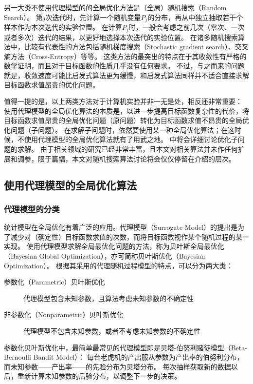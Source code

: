 \documentclass[index]{subfiles}
\begin{document}
另一大类不使用代理模型的的全局优化方法是（全局）随机搜索（Random Search）。
第$j$次迭代时，先计算一个随机变量$P_j$的分布，再从中独立抽取若干个样本作为本次迭代的实验位置。
在计算$P_j$时，一般会考虑之前几次（零次、一次或者多次）迭代的结果，以更好地选择本次迭代的实验位置。
在诸多随机搜索算法中，比较有代表性的方法包括随机梯度搜索（Stochastic gradient search）、交叉熵方法（Cross-Entropy）等等\cite{zabinsky2009}。
这类方法的最突出的特点在于其收敛性有严格的数学证明，而且对于目标函数的性质几乎没有任何要求\cite{zhigljavsky2007}。
不过，与之而来的问题就是，收敛速度可能比启发式算法更为缓慢，和启发式算法同样并不适合直接求解目标函数求值昂贵的优化问题。

值得一提的是，以上两类方法对于计算机实验并非一无是处，相反还非常重要：
使用代理模型的全局优化算法的本质是，以进一步提高目标函数复杂性的代价，将目标函数求值昂贵的全局优化问题（原问题）转化为目标函数求值不昂贵的全局优化问题（子问题）。
在求解子问题时，依然要使用某一种全局优化算法；在这时候，不使用代理模型的全局优化算法就有了用武之地。
中将会详细讨论优化子问题的求解。
由于相关领域的研究已经非常丰富，且本文对相关算法并未作任何扩展和调参，限于篇幅，本文对随机搜索算法讨论将会仅仅停留在介绍的层次。

\subsection{使用代理模型的全局优化算法}\label{ssec:go-mdl}
\subsubsection{代理模型的分类}
统计模型在全局优化有着广泛的应用。代理模型（Surrogate Model）的提出是为了减少对（确定性）目标函数求值的次数，而将目标函数视作某个随机过程的某一实现。
使用代理模型求解全局最优化问题的方法，称为贝叶斯全局最优化（Bayesian Global Optimization），亦可简称贝叶斯优化（Bayesian Optimization）。
根据其采用的代理随机过程模型的特点，可以分为两大类：
\begin{description}
  \item[参数化（Parametric）贝叶斯优化] 代理模型包含未知参数，且算法考虑未知参数的不确定性
  \item[非参数化（Nonparametric）贝叶斯优化] 代理模型不包含未知参数，或者不考虑未知参数的不确定性
\end{description}

参数化贝叶斯优化中，最简单最常见的代理模型即是贝塔-伯努利赌徒模型（Beta-Bernoulli Bandit Model）：
每台老虎机的产出服从参数为产出率的伯努利分布，而未知参数——产出率——的先验分布为贝塔分布。
每次抽样获取新的数据以后，重新计算未知参数的后验分布，以调整下一步的决策。\cite{shahriari2016}
\end{document}
